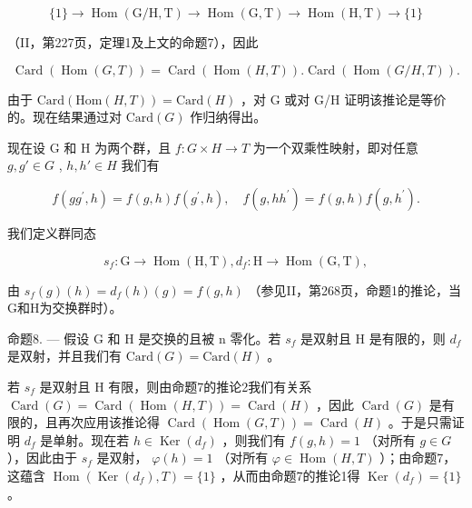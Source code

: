 \[
\{1 \} \rightarrow \operatorname{Hom} (\mathrm{G} / \mathrm{H}, \mathrm{T}) \rightarrow \operatorname{Hom} (\mathrm{G}, \mathrm{T}) \rightarrow \operatorname{Hom} (\mathrm{H}, \mathrm{T}) \rightarrow \{1 \}
\]

（II，第227页，定理1及上文的命题7），因此

\[
\operatorname{Card} (\operatorname{Hom} (G, T)) = \operatorname{Card} (\operatorname{Hom} (H, T)). \operatorname{Card} (\operatorname{Hom} (G / H, T)).
\]

由于 \(\text{Card}(\text{Hom}(H, T)) = \text{Card}(H)\) ，对 G 或对 G/H 证明该推论是等价的。现在结果通过对 \(\text{Card}(G)\) 作归纳得出。

现在设 G 和 H 为两个群，且 \(f: G \times H \to T\) 为一个双乘性映射，即对任意 \(g, g' \in G\) , \(h, h' \in H\) 我们有

\[
f (g g ^ {\prime}, h) = f (g, h) f (g ^ {\prime}, h), \quad f (g, h h ^ {\prime}) = f (g, h) f (g, h ^ {\prime}).
\]

我们定义群同态

\[
s _ {f} \colon \mathrm{G} \to \operatorname{Hom} (\mathrm{H}, \mathrm{T}), d _ {f} \colon \mathrm{H} \to \operatorname{Hom} (\mathrm{G}, \mathrm{T}),
\]

由 \(s_f(g)(h) = d_f(h)(g) = f(g, h)\) （参见II，第268页，命题1的推论，当G和H为交换群时）。

命题8. --- 假设 G 和 H 是交换的且被 n 零化。若 \(s_{f}\) 是双射且 H 是有限的，则 \(d_{f}\) 是双射，并且我们有 \(\text{Card}(G) = \text{Card}(H)\) 。

若 \(s_{f}\) 是双射且 H 有限，则由命题7的推论2我们有关系 \(\operatorname{Card}(G) = \operatorname{Card}(\operatorname{Hom}(H, T)) = \operatorname{Card}(H)\) ，因此 \(\operatorname{Card}(G)\) 是有限的，且再次应用该推论得 \(\operatorname{Card}(\operatorname{Hom}(G, T)) = \operatorname{Card}(H)\) 。于是只需证明 \(d_{f}\) 是单射。现在若 \(h \in \operatorname{Ker}(d_{f})\) ，则我们有 \(f(g, h) = 1\) （对所有 \(g \in G\) ），因此由于 \(s_{f}\) 是双射， \(\varphi(h) = 1\) （对所有 \(\varphi \in \operatorname{Hom}(H, T)\) ）；由命题7，这蕴含 \(\operatorname{Hom}(\operatorname{Ker}(d_{f}), T) = \{1\}\) ，从而由命题7的推论1得 \(\operatorname{Ker}(d_{f}) = \{1\}\) 。

